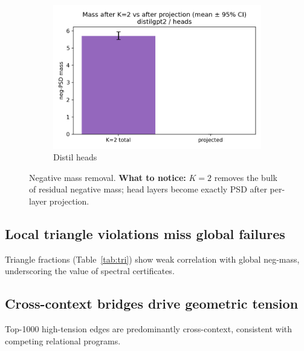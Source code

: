 \documentclass[11pt]{article}
\newcommand{\1}{\mathbf{1}}
\begin{document}
\begin{figure}[t]
\begin{subfigure}[t]{0.32\textwidth}
\includegraphics[width=\linewidth]{figs/mass_panel_distilgpt2_heads.png}
\caption{Distil heads}
\end{subfigure}
\caption{Negative mass removal. \textbf{What to notice:} $K{=}2$ removes the bulk of residual negative mass; head layers become exactly PSD after per-layer projection.}
\label{fig:masspanels}
\end{figure}

\subsection{Local triangle violations miss global failures}
Triangle fractions (Table~\ref{tab:tri}) show weak correlation with global neg-mass, underscoring the value of spectral certificates.

\subsection{Cross-context bridges drive geometric tension}
Top-1000 high-tension edges are predominantly cross-context, consistent with competing relational programs.
\end{document}
